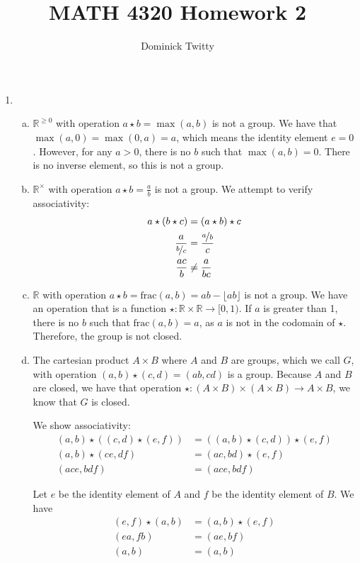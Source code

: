 \documentclass[12pt]{article}
\newcommand*{\Real}{\mathbb{R}}
\begin{document}
\title{MATH 4320 Homework 2}
\author{Dominick Twitty}
\maketitle

\begin{enumerate}
\item
\begin{enumerate}[(a)]
\item $\Real^{\geq 0}$ with operation $a \star b = \max(a,b)$ is not a group. We have that $\max(a, 0) = \max(0, a) = a$, which means the identity element $e = 0$. However, for any $a > 0$, there is no $b$ such that $\max(a, b) = 0$. There is no inverse element, so this is not a group.

\item $\Real^\times$ with operation $a \star b = \frac{a}{b}$ is not a group. We attempt to verify associativity:
\begin{align*}
a \star (b \star c) &= (a \star b) \star c\\
\frac{a}{\nicefrac{b}{c}} &= \frac{\nicefrac{a}{b}}{c}\\
\frac{ac}{b} &\neq \frac{a}{bc}
\end{align*}

\item $\Real$ with operation $a \star b = \text{frac}(a, b) = ab - \lfloor ab \rfloor$ is not a group. We have an operation that is a function $\star : \Real \times \Real \rightarrow [0, 1)$. If $a$ is greater than 1, there is no $b$ such that $\text{frac}(a, b) = a$, as $a$ is not in the codomain of $\star$. Therefore, the group is not closed. 

\item The cartesian product $A \times B$ where $A$ and $B$ are groups, which we call $G$, with operation $(a, b) \star (c, d) = (ab, cd)$ is a group. Because $A$ and $B$ are closed, we have that operation $\star : (A \times B) \times (A \times B) \rightarrow A \times B$, we know that $G$ is closed.

We show associativity:
\begin{align*}
(a,b) \star ((c, d) \star (e, f)) &= ((a,b) \star (c, d)) \star (e, f)\\
(a, b) \star (ce, df) &= (ac, bd) \star (e, f)\\
(ace, bdf) &= (ace, bdf)
\end{align*}

Let $e$ be the identity element of $A$ and $f$ be the identity element of $B$. We have
\begin{align*}
(e, f) \star (a, b) &= (a,b) \star (e, f)\\
(ea, fb) &= (ae, bf)\\
(a, b) &= (a, b)
\end{align*}


\end{enumerate}
\end{enumerate}
\end{document}
